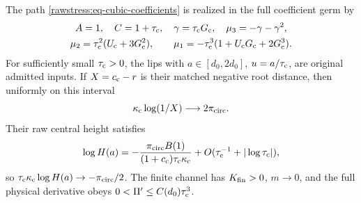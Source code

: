\begin{proposition}\label{rawstress:prop-cubic}
The path \eqref{rawstress:eq-cubic-coefficients} is realized in the full
coefficient germ by
\begin{equation}\label{rawstress:eq-cubic-full-coefficients}
 \begin{gathered}
 A=1,\quad C=1+\tau_{\rm c},\quad
 \gamma=\tau_{\rm c}G_{\rm c},\quad
 \mu_3=-\gamma-\gamma^2,\\
 \mu_2=\tau_{\rm c}^2(U_{\rm c}+3G_{\rm c}^2),\qquad
 \mu_1=-\tau_{\rm c}^3(1+U_{\rm c}G_{\rm c}+2G_{\rm c}^3).
 \end{gathered}
\end{equation}
For sufficiently small \(\tau_{\rm c}>0\), the lips with
\(a\in[d_0,2d_0]\), \(u=a/\tau_{\rm c}\), are original admitted
inputs. If \(X=c_{\rm c}-r\) is their matched negative root distance,
then uniformly on this interval
\begin{equation}\label{rawstress:eq-cubic-root-distance}
 \kappa_{\rm c}\log(1/X)\longrightarrow2\pi_{\rm circ}.
\end{equation}
Their raw central height satisfies
\begin{equation}\label{rawstress:eq-cubic-height}
 \log H(a)=
 -\frac{\pi_{\rm circ}B(1)}
             {(1+c_{\rm c})\tau_{\rm c}\kappa_{\rm c}}
                  +O(\tau_{\rm c}^{-1}+|\log\tau_{\rm c}|),
\end{equation}
so \(\tau_{\rm c}\kappa_{\rm c}\log H(a)\to-\pi_{\rm circ}/2\).
The finite channel has \(K_{\rm fin}>0\), \(m\to0\), and the full
physical derivative obeys \(0<\Pi'\le C(d_0)\tau_{\rm c}^3\).
\end{proposition}


